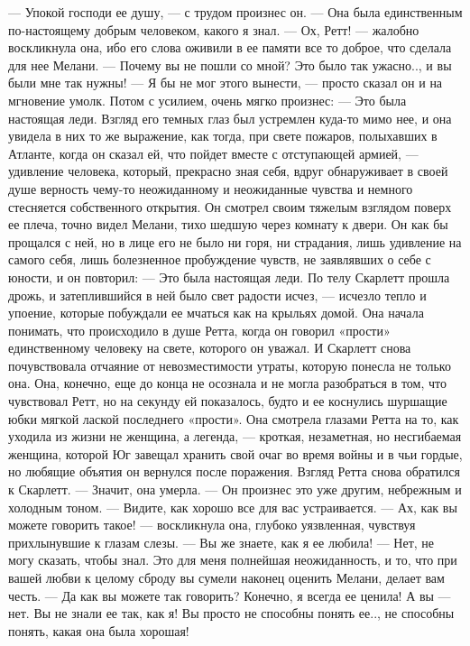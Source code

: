 — Упокой господи ее душу, — с трудом произнес он. — Она была единственным по-настоящему добрым человеком, какого я знал.
— Ох, Ретт! — жалобно воскликнула она, ибо его слова оживили в ее памяти все то доброе, что сделала для нее Мелани. — Почему вы не пошли со мной? Это было так ужасно.., и вы были мне так нужны!
— Я бы не мог этого вынести, — просто сказал он и на мгновение умолк. Потом с усилием, очень мягко произнес: — Это была настоящая леди.
Взгляд его темных глаз был устремлен куда-то мимо нее, и она увидела в них то же выражение, как тогда, при свете пожаров, полыхавших в Атланте, когда он сказал ей, что пойдет вместе с отступающей армией, — удивление человека, который, прекрасно зная себя, вдруг обнаруживает в своей душе верность чему-то неожиданному и неожиданные чувства и немного стесняется собственного открытия.
Он смотрел своим тяжелым взглядом поверх ее плеча, точно видел Мелани, тихо шедшую через комнату к двери. Он как бы прощался с ней, но в лице его не было ни горя, ни страдания, лишь удивление на самого себя, лишь болезненное пробуждение чувств, не заявлявших о себе с юности, и он повторил:
— Это была настоящая леди.
По телу Скарлетт прошла дрожь, и затеплившийся в ней было свет радости исчез, — исчезло тепло и упоение, которые побуждали ее мчаться как на крыльях домой. Она начала понимать, что происходило в душе Ретта, когда он говорил «прости» единственному человеку на свете, которого он уважал. И Скарлетт снова почувствовала отчаяние от невозместимости утраты, которую понесла не только она. Она, конечно, еще до конца не осознала и не могла разобраться в том, что чувствовал Ретт, но на секунду ей показалось, будто и ее коснулись шуршащие юбки мягкой лаской последнего «прости». Она смотрела глазами Ретта на то, как уходила из жизни не женщина, а легенда, — кроткая, незаметная, но несгибаемая женщина, которой Юг завещал хранить свой очаг во время войны и в чьи гордые, но любящие объятия он вернулся после поражения.
Взгляд Ретта снова обратился к Скарлетт.
— Значит, она умерла. — Он произнес это уже другим, небрежным и холодным тоном. — Видите, как хорошо все для вас устраивается.
— Ах, как вы можете говорить такое! — воскликнула она, глубоко уязвленная, чувствуя прихлынувшие к глазам слезы. — Вы же знаете, как я ее любила!
— Нет, не могу сказать, чтобы знал. Это для меня полнейшая неожиданность, и то, что при вашей любви к целому сброду вы сумели наконец оценить Мелани, делает вам честь.
— Да как вы можете так говорить? Конечно, я всегда ее ценила! А вы — нет. Вы не знали ее так, как я! Вы просто не способны понять ее.., не способны понять, какая она была хорошая!
